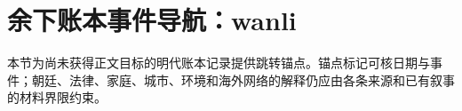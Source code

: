 \section{余下账本事件导航：wanli}

\label{sec:remaining-event-anchors-wanli}

本节为尚未获得正文目标的明代账本记录提供跳转锚点。锚点标记可核日期与事件；朝廷、法律、家庭、城市、环境和海外网络的解释仍应由各条来源和已有叙事的材料界限约束。
